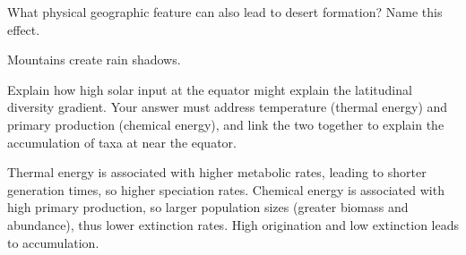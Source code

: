 \documentclass[11pt, addpoints]{exam}
\newcommand*\AnswerBox[2]{%
    \parbox[t][#1]{0.92\textwidth}{%
    \begin{solution}#2\end{solution}}
    \vspace*{\stretch{1}}
}
\begin{document}
\begin{questions}

\question[4]
What physical geographic feature can also lead to desert formation?  Name this effect.

\AnswerBox{0.1\textheight}{%
Mountains create rain shadows.
}


\newpage

%



\question[10]
Explain how high solar input at the equator might explain the latitudinal diversity gradient. Your answer must address temperature (thermal energy) and primary production (chemical energy), and link the two together to explain the accumulation of taxa at near the equator.

\AnswerBox{0.4\textheight}{%
Thermal energy is associated with higher metabolic rates, leading to shorter generation times, so higher speciation rates. Chemical energy is associated with high primary production, so larger population sizes (greater biomass and abundance), thus lower extinction rates. High origination and low extinction leads to accumulation.
}





\end{questions}
\end{document}

